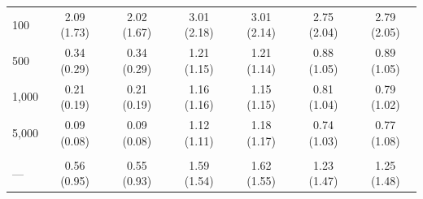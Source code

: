 \documentclass[AMA,STIX1COL,doublespace]{WileyNJD-v2}
\begin{document}
\begin{table}
\begin{tabular}[t]{lcccccc}
\hspace{1em}100 & 2.09 (1.73) & 2.02 (1.67) & 3.01 (2.18) & 3.01 (2.14) & 2.75 (2.04) & 2.79 (2.05)\\
\hspace{1em}500 & 0.34 (0.29) & 0.34 (0.29) & 1.21 (1.15) & 1.21 (1.14) & 0.88 (1.05) & 0.89 (1.05)\\
\hspace{1em}1,000 & 0.21 (0.19) & 0.21 (0.19) & 1.16 (1.16) & 1.15 (1.15) & 0.81 (1.04) & 0.79 (1.02)\\
\hspace{1em}5,000 & 0.09 (0.08) & 0.09 (0.08) & 1.12 (1.11) & 1.18 (1.17) & 0.74 (1.03) & 0.77 (1.08)\\
\addlinespace[0.75em]
\multicolumn{7}{l}{\textbf{Overall}}\\
\hline
\hspace{1em}--- & 0.56 (0.95) & 0.55 (0.93) & 1.59 (1.54) & 1.62 (1.55) & 1.23 (1.47) & 1.25 (1.48)\\
\bottomrule
\end{tabular}
\end{table}
\end{document}
